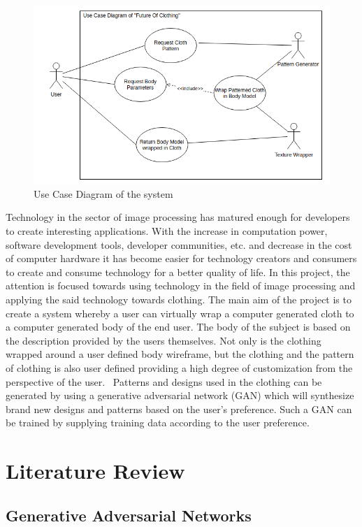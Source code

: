 \documentclass{article}
\begin{document}
\begin{figure}[h]
    \includegraphics[scale=0.6]{images/softwareDiagrams/FinalSystemUseCase.png}
    \centering
    \caption{Use Case Diagram of the system}
    
\end{figure}
Technology in the sector of image processing has matured enough for developers to create interesting applications. With the increase in computation power, software development tools, developer communities, etc. and decrease in the cost of computer hardware it has become easier for technology creators and consumers to create and consume technology for a better quality of life.
In this project, the attention is focused towards using technology in the field of image processing and applying the said technology towards clothing. The main aim of the project is to create a system whereby a user can virtually wrap a computer generated cloth to a computer generated body of the end user. The body of the subject is based on the description provided by the users themselves. Not only is the clothing wrapped around a user defined body wireframe, but the clothing and the pattern of clothing is also user defined providing a high degree of customization from the perspective of the user. 
Patterns and designs used in the clothing can be generated by using a generative adversarial network (GAN) which will synthesize brand new designs and patterns based on the user’s preference. Such a GAN can be trained by supplying training data according to the user preference.
\newpage
\section{Literature Review}
\subsection{Generative Adversarial Networks}
\end{document}
